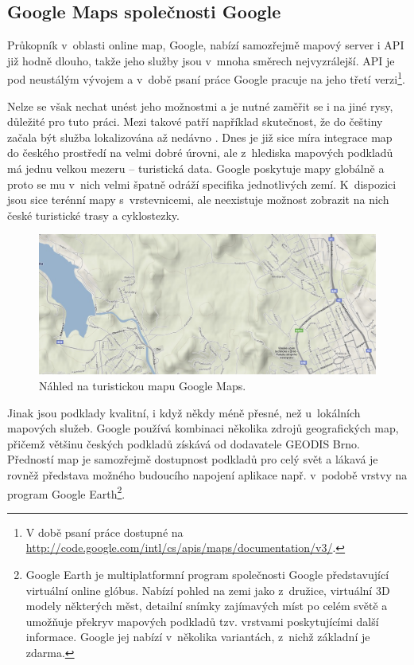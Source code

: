 \subsection{Google Maps společnosti Google}
Průkopník v~oblasti online map, Google, nabízí samozřejmě mapový
server i API již hodně dlouho, takže jeho služby jsou v~mnoha směrech
nej\-vyzrálejší. API je pod neustálým vývojem a v~době psaní práce
Google pracuje na jeho třetí
verzi\footnote{V době psaní práce dostupné na
\url{http://code.google.com/intl/cs/apis/maps/documentation/v3/}.}.

Nelze se však nechat unést jeho možnostmi a je nutné zaměřit se i na
jiné rysy, důležité pro tuto práci. Mezi takové patří
například skutečnost, že do češtiny začala být služba lokalizována až
nedávno \cite{googleCesky}.
Dnes je již sice míra integrace map do českého prostředí na velmi
dobré úrovni, ale z~hlediska mapových podkladů má jednu velkou mezeru
-- turistická data. Google poskytuje mapy globálně a proto se mu
v~nich velmi špatně odráží specifika jednotlivých zemí. K~dispozici
jsou sice terénní mapy s~vrstevnicemi, ale neexistuje možnost
zobrazit na nich české turistické trasy a cyklostezky.

\begin{figure}[h]
	\includegraphics[width=\textwidth, keepaspectratio]{fig/mapagoogle}
	\caption{Náhled na turistickou mapu Google Maps.}
	\label{obrGoogleMap}
\end{figure}

Jinak jsou podklady kvalitní, i když někdy méně přesné, než
u~lokálních mapových služeb. Google používá kombinaci několika zdrojů
geografických map, přičemž většinu českých podkladů získává od
dodavatele GEODIS Brno. Předností map je samozřejmě dostupnost
podkladů pro celý svět a lákavá je rovněž představa možného budoucího 
napojení aplikace např. v~podobě vrstvy na program Google
Earth\footnote{Google Earth je multiplatformní program společnosti
Google představující virtuální online glóbus. Nabízí pohled na zemi
jako z~družice, virtuální 3D modely některých měst, detailní snímky
zajímavých míst po celém světě a umožňuje překryv mapových podkladů
tzv. vrstvami poskytujícími další informace. Google jej nabízí
v~několika variantách, z~nichž základní je zdarma.}.

